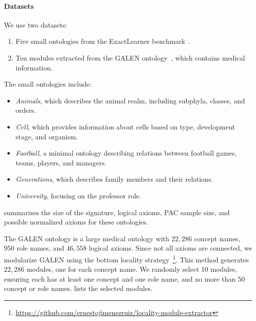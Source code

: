 \paragraph{Datasets}
\label{par:datasets}
We use two datasets:
%
\begin{enumerate}
    \item Five small ontologies from the ExactLearner benchmark~\cite{DBLP:conf/kr/DuarteKO18}.
    \item Ten modules extracted from the GALEN ontology~\cite{Rector2008TheGH}, which contains medical information.
\end{enumerate}
%
The small ontologies include:
%
\begin{itemize}
    \item \emph{Animals}, which describes the animal realm, including subphyla, classes, and orders.
    \item \emph{Cell}, which provides information about cells based on type, development stage, and organism.
    \item \emph{Football}, a minimal ontology describing relations between football games, teams, players, and managers.
    \item \emph{Generations}, which describes family members and their relations.
    \item \emph{University}, focusing on the professor role.
\end{itemize}
%
 summarizes the size of the signature, logical axioms, \gls{PAC} sample size, and possible normalized axioms for these ontologies.

%

The GALEN ontology is a large medical ontology with \(22,286\) concept names, \(950\) role names, and \(46,558\) logical axioms.
%
Since not all axioms are connected, we modularize GALEN using the bottom locality strategy~\cite{DBLP:journals/jair/GrauHKS08}\footnote{\url{https://github.com/ernestojimenezruiz/locality-module-extractor}}.
%
This method generates \(22,286\) modules, one for each concept name.
%
We randomly select 10 modules, ensuring each has at least one concept and one role name, and no more than 50 concept or role names.
%
 lists the selected modules.

%

